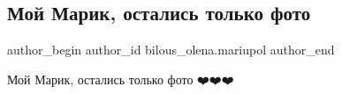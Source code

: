  
 
 
 
 

\subsection{Мой Марик, остались только фото}
\label{sec:30_03_2022.fb.bilous_olena.mariupol.1.moj_marik_ostalis_tolko_foto}

\ifcmt
 author_begin
   author_id bilous_olena.mariupol
 author_end
\fi

Мой Марик, остались только фото ❤️❤️❤️

